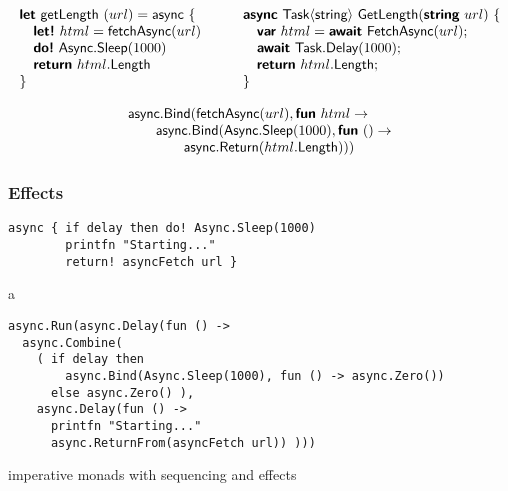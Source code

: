 \documentclass[runningheads,a4paper]{llncs}
\begin{document}
\begin{equation*}
\begin{array}{l}
\kvd{let}~\ident{getLength}~(url)=\ident{async}~\{\\
\quad \kvd{let!}~html = \ident{fetchAsync}(url)\\
\quad \kvd{do!}~\ident{Async}.\ident{Sleep}(1000)\\
\quad \kvd{return}~html.\ident{Length}\\
\}
\end{array}\qquad
\begin{array}{l}
\kvd{async}~\ident{Task}\langle\ident{string}\rangle~\ident{GetLength}(\kvd{string}~url)~\{\\
\quad \kvd{var}~html = \kvd{await}~\ident{FetchAsync}(url);\\
\quad \kvd{await}~\ident{Task}.\ident{Delay}(1000);\\
\quad \kvd{return}~html.\ident{Length};\\
\}
\end{array}
\end{equation*}

\begin{equation*}
\begin{array}{l}
\textnormal{\sffamily async}.\textnormal{\sffamily Bind}(\textnormal{\sffamily fetchAsync}(url), \textnormal{\bfseries\sffamily fun}~html\rightarrow\\
\qquad \textnormal{\sffamily async}.\textnormal{\sffamily Bind}(\textnormal{\sffamily Async}.\textnormal{\sffamily Sleep}(1000), \textnormal{\bfseries\sffamily fun}~()\rightarrow\\
\qquad\qquad \textnormal{\sffamily async}.\textnormal{\sffamily Return}(html.\textnormal{\sffamily Length})))
\end{array}
\end{equation*}


\subsubsection{Effects}

\begin{verbatim}
async { if delay then do! Async.Sleep(1000) 
        printfn "Starting..."
        return! asyncFetch url }
\end{verbatim}

a

\begin{verbatim}
async.Run(async.Delay(fun () -> 
  async.Combine(
    ( if delay then 
        async.Bind(Async.Sleep(1000), fun () -> async.Zero()) 
      else async.Zero() ), 
    async.Delay(fun () -> 
      printfn "Starting..."
      async.ReturnFrom(asyncFetch url)) )))
\end{verbatim}
imperative monads with sequencing and effects
\end{document}
